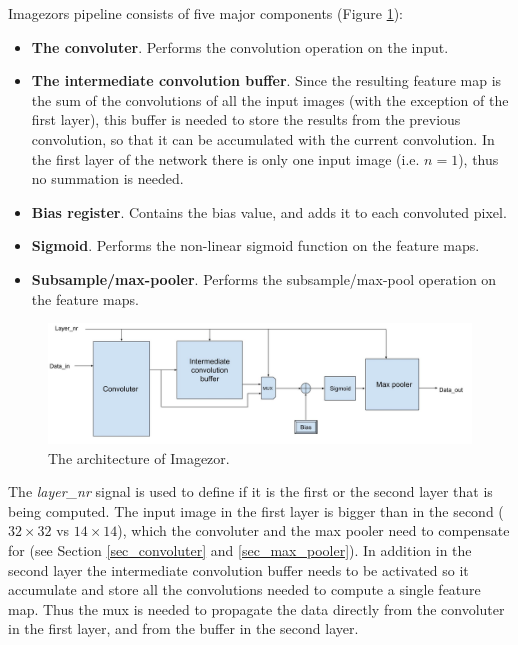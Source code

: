 Imagezors pipeline consists of five major components (Figure \ref{fig_imagezor_architecture}):

\begin{itemize}
	\item \textbf{The convoluter}. Performs the convolution operation on the input.
	\item \textbf{The intermediate convolution buffer}. Since the resulting feature map is the sum of the convolutions of all the input images (with the exception of the first layer), this buffer is needed to store the results from the previous convolution, so that it can be accumulated with the current convolution. In the first layer of the network there is only one input image (i.e. $ n = 1 $), thus no summation is needed.
	\item \textbf{Bias register}. Contains the bias value, and adds it to each convoluted pixel. 
	\item \textbf{Sigmoid}. Performs the non-linear sigmoid function  on the feature maps.
	\item \textbf{Subsample/max-pooler}. Performs the subsample/max-pool operation on the feature maps. 
\end{itemize}

\begin{figure}[h!]
	\centering
    	\includegraphics[width=1.0\textwidth]{Figures/Method/conv_layer_arch}
  	\caption{The architecture of Imagezor.}
  	\label{fig_imagezor_architecture}
\end{figure}

The \textit{layer\_nr} signal is used to define if it is the first or the second layer that is being computed. The input image in the first layer is bigger than in the second ($ 32 \times 32 $ vs $ 14 \times 14 $), which the convoluter and the max pooler need to compensate for (see Section \ref{sec_convoluter} and \ref{sec_max_pooler}). In addition in the second layer the intermediate convolution buffer needs to be activated so it accumulate and store all the convolutions needed to compute a single feature map. Thus the mux is needed to propagate the data directly from the convoluter in the first layer, and from the buffer in the second layer. 

